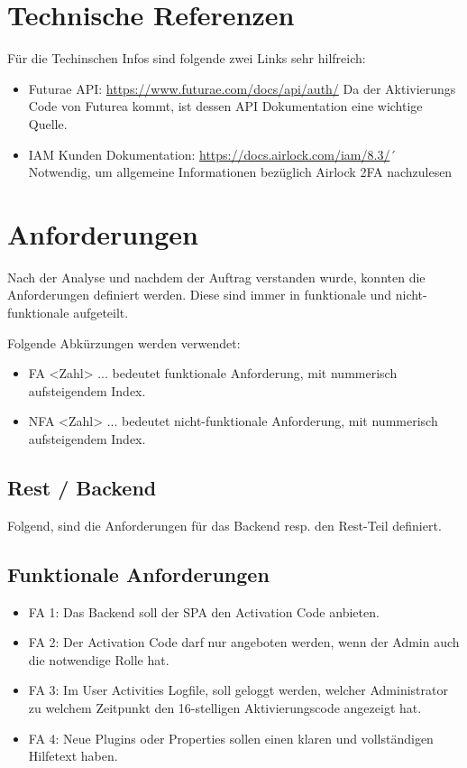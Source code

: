 \section{Technische Referenzen}
Für die Techinschen Infos sind folgende zwei Links sehr hilfreich:
\begin{itemize}
	\item Futurae API: \url{https://www.futurae.com/docs/api/auth/}\newline
	 Da der Aktivierungs Code von Futurea kommt, ist dessen API Dokumentation eine wichtige Quelle.
	\item IAM Kunden Dokumentation: \url{https://docs.airlock.com/iam/8.3/}´
	Notwendig, um allgemeine Informationen bezüglich Airlock 2FA nachzulesen
\end{itemize}

\section{Anforderungen}
Nach der Analyse und nachdem der Auftrag verstanden wurde, konnten die Anforderungen definiert werden. Diese sind immer in funktionale und nicht-funktionale aufgeteilt.

Folgende Abkürzungen werden verwendet:
\begin{itemize}
	\item FA <Zahl> ... bedeutet funktionale Anforderung, mit nummerisch aufsteigendem Index.
	\item NFA <Zahl> ... bedeutet nicht-funktionale Anforderung, mit nummerisch aufsteigendem Index.
\end{itemize}

\subsection{Rest / Backend} \label{subsec:anforderungenBackend}

Folgend, sind die Anforderungen für das Backend resp. den Rest-Teil definiert.

\subsection*{Funktionale Anforderungen}
\begin{itemize}
	\item FA 1: Das Backend soll der SPA den Activation Code anbieten.
	\item FA 2: Der Activation Code darf nur angeboten werden, wenn der Admin auch die notwendige Rolle hat.
	\item FA 3: Im User Activities Logfile, soll geloggt werden, welcher Administrator zu welchem Zeitpunkt den 16-stelligen Aktivierungscode angezeigt hat.
	\item FA 4: Neue Plugins oder Properties sollen einen klaren und vollständigen Hilfetext haben.
\end{itemize}

